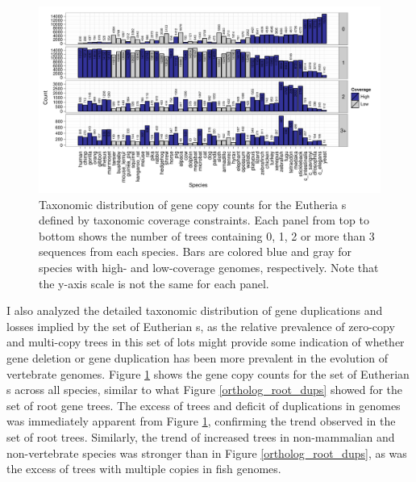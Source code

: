 \begin{landscape}
\begin{figure}
\centering
\includegraphics[scale=0.9]{Figs/ortholog_euth_dups.pdf}
\caption{Taxonomic distribution of gene copy counts for the Eutheria
  \subtr{}s defined by taxonomic coverage constraints. Each panel from
  top to bottom shows the number of trees containing 0, 1, 2 or more
  than 3 sequences from each species. Bars are colored blue and gray
  for species with high- and low-coverage genomes, respectively. Note
  that the y-axis scale is not the same for each panel.}
\label{fig_ortholog_euth_dups}
\end{figure}
\end{landscape}

I also analyzed the detailed taxonomic distribution of gene
duplications and losses implied by the set of Eutherian \subtr{}s, as
the relative prevalence of zero-copy and multi-copy trees in this set
of \acp{lot} might provide some indication of whether gene deletion or
gene duplication has been more prevalent in the evolution of
vertebrate genomes. Figure \ref{fig_ortholog_euth_dups} shows the gene copy
counts for the set of Eutherian \subtr{}s across all \ens species,
similar to what Figure \ref{ortholog_root_dups} showed for the set of
root \cmp gene trees. The excess of \zcop trees and deficit of
duplications in \lcv genomes was immediately apparent from Figure
\ref{fig_ortholog_euth_dups}, confirming the trend observed in the set of
root \cmp trees. Similarly, the trend of increased \zcop trees in
non-mammalian and non-vertebrate species was stronger than in Figure
\ref{ortholog_root_dups}, as was the excess of trees with multiple
copies in fish genomes.

